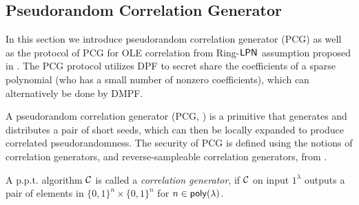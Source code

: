 \subsection{Pseudorandom Correlation Generator}\label{sec:PCG_prelim}
In this section we introduce pseudorandom correlation generator (PCG) as well as the protocol of PCG for OLE correlation from Ring-${\sf LPN}$ assumption proposed in \cite{cryptoeprint:2022/1035}. The PCG protocol utilizes DPF to secret share the coefficients of a sparse polynomial (who has a small number of nonzero coefficients), which can alternatively be done by DMPF. 

A pseudorandom correlation generator (PCG, \cite{cryptoeprint:2019/273,cryptoeprint:2019/448}) is a primitive that generates and distributes a pair of short seeds, which can then be locally expanded to produce correlated pseudorandomness. The security of PCG is defined using the notions of correlation generators, and reverse-sampleable correlation generators, from \cite{cryptoeprint:2019/448}. 

\begin{definition}\label{def:correlation_generator}A p.p.t. algorithm $\mathcal{C}$ is called a \emph{correlation generator}, if $\mathcal{C}$ on input $1^\lambda$ outputs a pair of elements in $\{0, 1\}^n \times \{0, 1\}^n$ for $n \in {\sf poly}(\lambda)$. 
\end{definition} 


